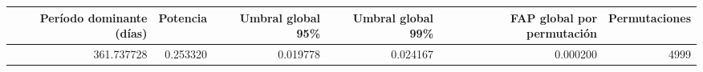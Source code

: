 \begin{tabular}{rrrrrr}
\toprule
Período dominante (días) & Potencia & Umbral global 95\% & Umbral global 99\% & FAP global por permutación & Permutaciones \\
\midrule
361.737728 & 0.253320 & 0.019778 & 0.024167 & 0.000200 & 4999 \\
\bottomrule
\end{tabular}
